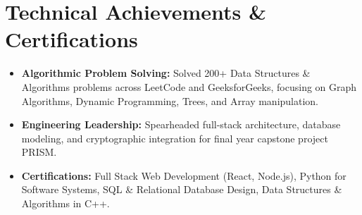 \documentclass[a4paper,9pt]{article}
\begin{document}
\section*{Technical Achievements \& Certifications}
\begin{itemize}
\item \textbf{Algorithmic Problem Solving:} Solved 200+ Data Structures \& Algorithms problems across LeetCode and GeeksforGeeks, focusing on Graph Algorithms, Dynamic Programming, Trees, and Array manipulation.
\item \textbf{Engineering Leadership:} Spearheaded full-stack architecture, database modeling, and cryptographic integration for final year capstone project PRISM.
\item \textbf{Certifications:} Full Stack Web Development (React, Node.js), Python for Software Systems, SQL \& Relational Database Design, Data Structures \& Algorithms in C++.
\end{itemize}
\end{document}
